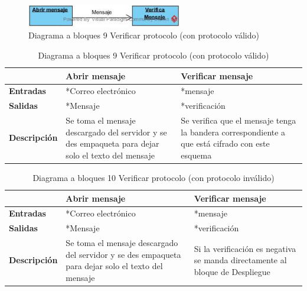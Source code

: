 \begin{figure}[H]
	\includegraphics[width=1\linewidth, height=1cm]{./images/bloques9.jpg}
	\caption{Diagrama a bloques 9 Verificar protocolo (con protocolo válido)}
	\label{fig:5-9-1}
\end{figure}
\begin{table}[H]
 \centering
   {
     \begin{tabular}{| p{3cm} | p{4cm} | p{4cm} |}
     \hline
     & \textbf{Abrir mensaje} & \textbf{Verificar mensaje}\\
     \hline
     \textbf{Entradas} & *Correo electrónico & *mensaje\\
     \hline
     \textbf{Salidas} & *Mensaje & *verificación\\
     \hline
     \textbf{Descripción} & Se toma el mensaje descargado del servidor y se des empaqueta para dejar solo el texto del mensaje & Se verifica que el mensaje tenga la bandera correspondiente a que está cifrado con este esquema\\

    \end{tabular}
    }
    \caption{Diagrama a bloques 9 Verificar protocolo (con protocolo válido)}
    \label{tabla:b9}
\end{table}


\clearpage
\begin{table}[H]
 \centering
   {
     \begin{tabular}{| p{3cm} | p{4cm} | p{4cm} |}
     \hline
     & \textbf{Abrir mensaje} & \textbf{Verificar mensaje}\\
     \hline
     \textbf{Entradas} & *Correo electrónico & *mensaje\\
     \hline
     \textbf{Salidas} & *Mensaje & *verificación\\
     \hline
     \textbf{Descripción} & Se toma el mensaje descargado del servidor y se des empaqueta para dejar solo el texto del mensaje & Si la verificación es negativa se manda directamente al bloque de Despliegue\\

    \end{tabular}
    }
    \caption{Diagrama a bloques 10 Verificar protocolo (con protocolo inválido)	}
    \label{tabla:b10}
\end{table}

